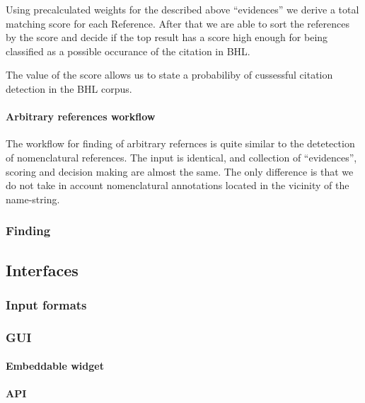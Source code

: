 \documentclass[
]{article}
\begin{document}
Using precalculated weights for the described above ``evidences'' we
derive a total matching score for each Reference. After that we are able
to sort the references by the score and decide if the top result has a
score high enough for being classified as a possible occurance of the
citation in BHL.

The value of the score allows us to state a probabiliby of cussessful
citation detection in the BHL corpus.

\hypertarget{arbitrary-references-workflow}{%
\paragraph{Arbitrary references
workflow}\label{arbitrary-references-workflow}}

The workflow for finding of arbitrary refernces is quite similar to the
detetection of nomenclatural references. The input is identical, and
collection of ``evidences'', scoring and decision making are almost the
same. The only difference is that we do not take in account
nomenclatural annotations located in the vicinity of the name-string.

\hypertarget{finding}{%
\subsubsection{Finding}\label{finding}}

\hypertarget{interfaces}{%
\subsection{Interfaces}\label{interfaces}}

\hypertarget{input-formats}{%
\subsubsection{Input formats}\label{input-formats}}

\hypertarget{gui}{%
\subsubsection{GUI}\label{gui}}

\hypertarget{embeddable-widget}{%
\paragraph{Embeddable widget}\label{embeddable-widget}}

\hypertarget{api}{%
\paragraph{API}\label{api}}
\end{document}

